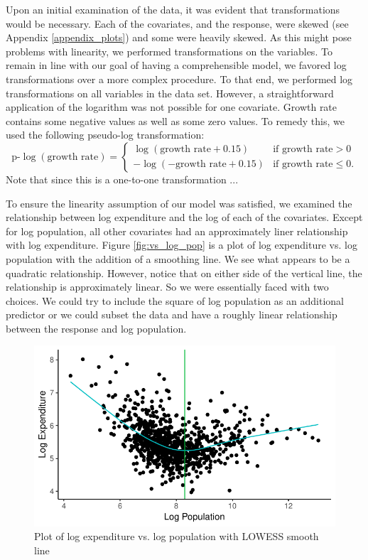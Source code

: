 \documentclass{article}\usepackage[]{graphicx}\usepackage[]{color}
\makeatletter
\def\maxwidth{ %
  \ifdim\Gin@nat@width>\linewidth
    \linewidth
  \else
    \Gin@nat@width
  \fi
}
\newenvironment{knitrout}{}{} %
\makeatother
\begin{document}
Upon an initial examination of the data, it was evident that transformations would be necessary. Each of the covariates, and the response, were skewed (see Appendix \ref{appendix_plots}) and some were heavily skewed. As this might pose problems with linearity, we performed transformations on the variables. To remain in line with our goal of having a comprehensible model, we favored log transformations over a more complex procedure. To that end, we performed log transformations on all variables in the data set.  However, a straightforward application of the logarithm was not possible for one covariate. Growth rate contains some negative values as well as some zero values. To remedy this, we used the following pseudo-log transformation:
\[
\text{p-}\log(\text{growth rate}) = %
  \begin{cases}
    \log(\text{growth rate} + 0.15) &\text{if growth rate} > 0 \\
    -\log(-\text{growth rate} + 0.15) &\text{if growth rate} \le 0.
  \end{cases}
\]
Note that since this is a one-to-one transformation ...

To ensure the linearity assumption of our model was satisfied, we examined the relationship between log expenditure and the log of each of the covariates. Except for log population, all other covariates had an approximately liner relationship with log expenditure. Figure \ref{fig:vs_log_pop} is a plot of log expenditure vs. log population with the addition of a smoothing line. We see what appears to be a quadratic relationship. However, notice that on either side of the vertical line, the relationship is approximately linear. So we were essentially faced with two choices. We could try to include the square of log population as an additional predictor or we could subset the data and have a roughly linear relationship between the response and log population.


\begin{knitrout}
\color{fgcolor}\begin{figure}[h]
\includegraphics[width=\maxwidth]{figure/r_fig_vs_log_pop-1} \caption{\label{fig:vs_log_pop} Plot of log expenditure vs. log population with LOWESS smooth line}\label{fig:r fig_vs_log_pop}
\end{figure}


\end{knitrout}
\end{document}
